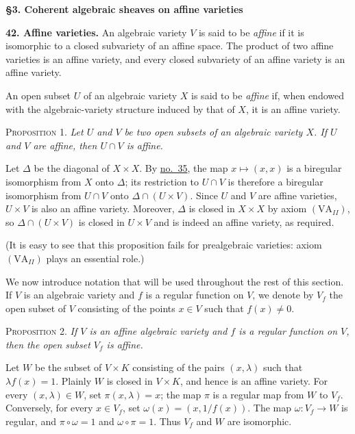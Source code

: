 
\bigskip
{}\label{fac:II:3}
\textbf{\S3. Coherent algebraic sheaves on affine varieties}

\medskip
{}\label{fac:II:3:no:42}
\textbf{42. Affine varieties.}
\label{fac:II:3:no:42:def:affine-variety}
An algebraic variety $V$ is said to be \textit{affine} if it is isomorphic to a closed subvariety of an affine space. The product of two affine varieties is an affine variety, and every closed subvariety of an affine variety is an affine variety.

\label{fac:II:3:no:42:def:affine-open-subset}
An open subset $U$ of an algebraic variety $X$ is said to be \textit{affine} if, when endowed with the algebraic-variety structure induced by that of $X$, it is an affine variety.

\label{fac:II:3:no:42:prop:1}
\textsc{Proposition 1.} \textit{Let $U$ and $V$ be two open subsets of an algebraic variety $X$. If $U$ and $V$ are affine, then $U\cap V$ is affine.}

Let $\Delta$ be the diagonal of $X\times X$. By \hyperref[fac:II:1:no:35]{no.~35}, the map $x\mapsto(x,x)$ is a biregular isomorphism from $X$ onto $\Delta$; its restriction to $U\cap V$ is therefore a biregular isomorphism from $U\cap V$ onto $\Delta\cap(U\times V)$. Since $U$ and $V$ are affine varieties, $U\times V$ is also an affine variety. Moreover, $\Delta$ is closed in $X\times X$ by axiom $(\mathrm{VA}_{II})$, so $\Delta\cap(U\times V)$ is closed in $U\times V$ and is indeed an affine variety, as required.

(It is easy to see that this proposition fails for prealgebraic varieties: axiom $(\mathrm{VA}_{II})$ plays an essential role.)

\label{fac:II:3:no:42:notation:V-f}
We now introduce notation that will be used throughout the rest of this section. If $V$ is an algebraic variety and $f$ is a regular function on $V$, we denote by $V_f$ the open subset of $V$ consisting of the points $x\in V$ such that $f(x)\neq0$.

\label{fac:II:3:no:42:prop:2}
\textsc{Proposition 2.} \textit{If $V$ is an affine algebraic variety and $f$ is a regular function on $V$, then the open subset $V_f$ is affine.}

Let $W$ be the subset of $V\times K$ consisting of the pairs $(x,\lambda)$ such that $\lambda f(x)=1$. Plainly $W$ is closed in $V\times K$, and hence is an affine variety. For every $(x,\lambda)\in W$, set $\pi(x,\lambda)=x$; the map $\pi$ is a regular map from $W$ to $V_f$. Conversely, for every $x\in V_f$, set $\omega(x)=(x,1/f(x))$. The map $\omega:V_f\to W$ is regular, and $\pi\circ\omega=1$ and $\omega\circ\pi=1$. Thus $V_f$ and $W$ are isomorphic.

